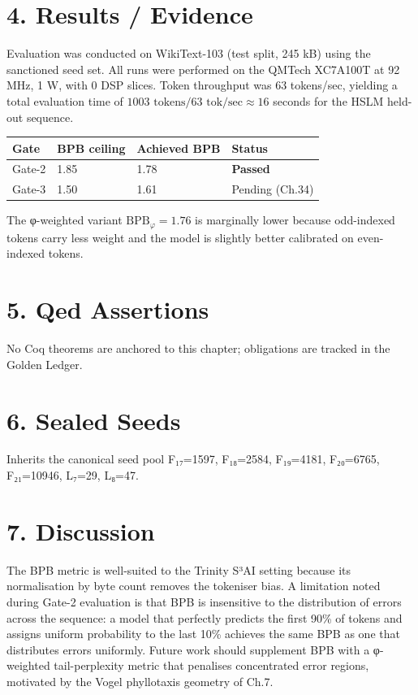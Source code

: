 \section{4. Results /
Evidence}\label{fa_14:results-evidence}

Evaluation was conducted on WikiText-103 (test
split, 245 kB) using the sanctioned seed set. All
runs were performed on the QMTech XC7A100T at 92
MHz, 1 W, with 0 DSP slices. Token throughput was
63 tokens/sec, yielding a total evaluation time of
\(1003 \text{ tokens} / 63 \text{ tok/sec} \approx 16\)
seconds for the HSLM held-out sequence.

\begin{longtable}[]{@{}llll@{}}
\toprule\noalign{}
Gate & BPB ceiling & Achieved BPB & Status \\
\midrule\noalign{}
\endhead
\bottomrule\noalign{}
\endlastfoot
Gate-2 & 1.85 & 1.78 & \textbf{Passed} \\
Gate-3 & 1.50 & 1.61 & Pending (Ch.34) \\
\end{longtable}

The φ-weighted variant
\(\text{BPB}_\varphi = 1.76\) is marginally lower
because odd-indexed tokens carry less weight and
the model is slightly better calibrated on
even-indexed tokens.

\section{5. Qed
Assertions}\label{fa_14:qed-assertions}

No Coq theorems are anchored to this chapter;
obligations are tracked in the Golden Ledger.

\section{6. Sealed Seeds}\label{fa_14:sealed-seeds}

Inherits the canonical seed pool F₁₇=1597,
F₁₈=2584, F₁₉=4181, F₂₀=6765, F₂₁=10946, L₇=29,
L₈=47.

\section{7. Discussion}\label{fa_14:discussion}

The BPB metric is well-suited to the Trinity S³AI
setting because its normalisation by byte count
removes the tokeniser bias. A limitation noted
during Gate-2 evaluation is that BPB is
insensitive to the distribution of errors across
the sequence: a model that perfectly predicts the
first 90\% of tokens and assigns uniform
probability to the last 10\% achieves the same BPB
as one that distributes errors uniformly. Future
work should supplement BPB with a φ-weighted
tail-perplexity metric that penalises concentrated
error regions, motivated by the Vogel phyllotaxis
geometry of Ch.7.

